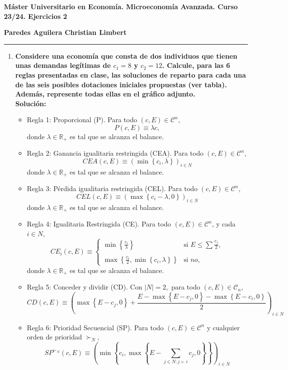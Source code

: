 \textbf{Máster Universitario en Economía. Microeconomía Avanzada. Curso 23/24. Ejercicios 2}
\begin{center}
    \textbf{Paredes Aguilera Christian Limbert}
\end{center}
\begin{center}
	\rule{1\textwidth}{0.4pt}
\end{center}

\begin{enumerate}

    \item \textbf{Considere una economía que consta de dos individuos que tienen unas demandas legítimas de $c_1 = 8$ y $c_2 = 12$. Calcule, para las 6 reglas presentadas en clase, las soluciones de reparto para cada una de las seis posibles dotaciones iniciales propuestas (ver tabla). Además, represente todas ellas en el gráfico adjunto.}\\

	\textbf{Solución:}
	\begin{itemize}
	    \item Regla 1: Proporcional (P). Para todo $(c,E)\in \mathcal{C}^n$,
		$$P(c,E)\equiv \lambda c,$$
	    donde $\lambda \in \mathbb{R}_+$ es tal que se alcanza el balance.
	    \item Regla 2: Ganancia igualitaria restringida (CEA). Para todo $(c,E)\in \mathcal{C}^n$,
	    $$CEA(c,E)\equiv \left(\min\left\{c_i,\lambda\right\}\right)_{i\in N}$$
	    donde $\lambda \in \mathbb{R}_+$ es tal que se alcanza el balance.
	    \item Regla 3: Pérdida igualitaria restringida (CEL). Para todo $(c,E)\in \mathcal{C}^n$,
	    $$CEL(c,E)\equiv \left(\max\left\{c_i-\lambda,0\right\}\right)_{i\in N}$$
	    donde $\lambda \in \mathbb{R}_+$ es tal que se alcanza el balance.
	    \item Regla 4: Igualitaria Restringida (CE). Para todo $(c,E)\in \mathcal{C}^n$, y cada $i\in N$,
	    $$
	    CE_i(c,E)\equiv \left\{
		\begin{array}{ll}
		    \min\left\{\frac{c_i}{\lambda}\right\} & \text{si } E\leq \sum \frac{c_j}{2},\\\\
		    \max\left\{\frac{c_i}{2},\min\left\{c_i,\lambda\right\}\right\} & \text{si } no,
		\end{array}
	    \right.
	    $$
	    donde $\lambda \in \mathbb{R}_+$ es tal que se alcanza el balance.
	    \item Regla 5: Conceder y dividir (CD). Con $|N|=2,$ para todo $(c,E)\in \mathcal{C}_n$,  
		$$CD(c,E)\equiv \left(\max\left\{E-c_j,0\right\}+\dfrac{E-\max\left\{E-c_j,0\right\}-\max\left\{E-c_i,0\right\}}{2}\right)_{i\in N}$$
	    \item Regla 6: Prioridad Secuencial (SP). Para todo $(c,E)\in \mathcal{C}^n$ y cualquier orden de prioridad $\succ_N$,
		$$SP^{\succ_N}(c,E) \equiv \left(\min\left\{c_i,\max\left\{E-\sum_{j\in N:j\succ i}c_j,0\right\}\right\}\right)_{i\in N}$$
	\end{itemize}


\end{enumerate}
